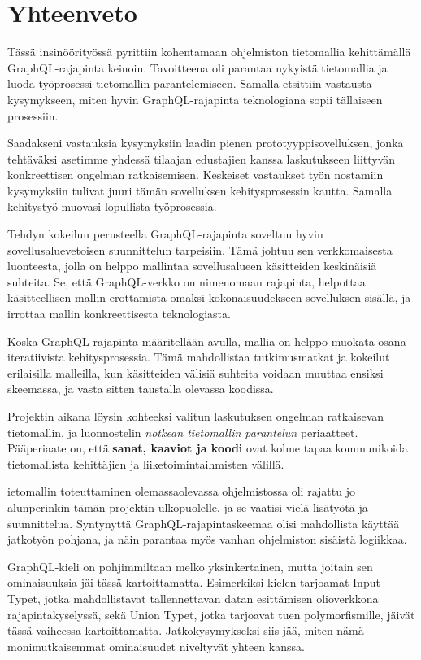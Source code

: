 \hypertarget{yhteenveto}{%
\chapter{Yhteenveto}\label{yhteenveto}}

Tässä insinöörityössä pyrittiin kohentamaan ohjelmiston tietomallia
kehittämällä GraphQL-rajapinta
 keinoin. Tavoitteena
oli parantaa nykyistä tietomallia ja luoda työprosessi tietomallin
parantelemiseen. Samalla etsittiin vastausta kysymykseen, miten hyvin
GraphQL-rajapinta teknologiana sopii tällaiseen prosessiin.

Saadakseni vastauksia kysymyksiin laadin pienen prototyyppisovelluksen,
jonka tehtäväksi asetimme yhdessä tilaajan edustajien kanssa
laskutukseen liittyvän konkreettisen ongelman ratkaisemisen. Keskeiset
vastaukset työn nostamiin kysymyksiin tulivat juuri tämän sovelluksen
kehitysprosessin kautta. Samalla kehitystyö muovasi lopullista
työprosessia.

Tehdyn kokeilun perusteella GraphQL-rajapinta soveltuu hyvin
sovellusaluevetoisen suunnittelun tarpeisiin. Tämä johtuu sen
verkkomaisesta luonteesta, jolla on helppo mallintaa sovellusalueen
käsitteiden keskinäisiä suhteita. Se, että GraphQL-verkko on nimenomaan
rajapinta, helpottaa käsitteellisen mallin erottamista omaksi
kokonaisuudekseen sovelluksen sisällä, ja irrottaa mallin
konkreettisesta teknologiasta.

Koska GraphQL-rajapinta määritellään  avulla,
mallia on helppo muokata osana iteratiivista kehitysprosessia. Tämä
mahdollistaa tutkimusmatkat ja kokeilut erilaisilla malleilla, kun
käsitteiden välisiä suhteita voidaan muuttaa ensiksi skeemassa, ja vasta
sitten taustalla olevassa koodissa.

Projektin aikana löysin kohteeksi valitun laskutuksen ongelman
ratkaisevan tietomallin, ja luonnostelin \emph{notkean tietomallin
parantelun} periaatteet. Pääperiaate on, että \textbf{sanat, kaaviot ja
koodi} ovat kolme tapaa kommunikoida tietomallista kehittäjien ja
liiketoimintaihmisten välillä.

ietomallin toteuttaminen olemassaolevassa ohjelmistossa oli rajattu jo
alunperinkin tämän projektin ulkopuolelle, ja se vaatisi vielä lisätyötä
ja suunnittelua. Syntynyttä GraphQL-rajapintaskeemaa olisi mahdollista
käyttää jatkotyön pohjana, ja näin parantaa myös vanhan ohjelmiston
sisäistä logiikkaa.

GraphQL-kieli on pohjimmiltaan melko yksinkertainen, mutta joitain sen
ominaisuuksia jäi tässä kartoittamatta. Esimerkiksi kielen tarjoamat
Input Typet, jotka mahdollistavat tallennettavan datan esittämisen
olioverkkona rajapintakyselyssä, sekä Union Typet, jotka tarjoavat tuen
polymorfismille, jäivät tässä vaiheessa kartoittamatta.
Jatkokysymykseksi siis jää, miten nämä monimutkaisemmat ominaisuudet
niveltyvät yhteen 
kanssa.
